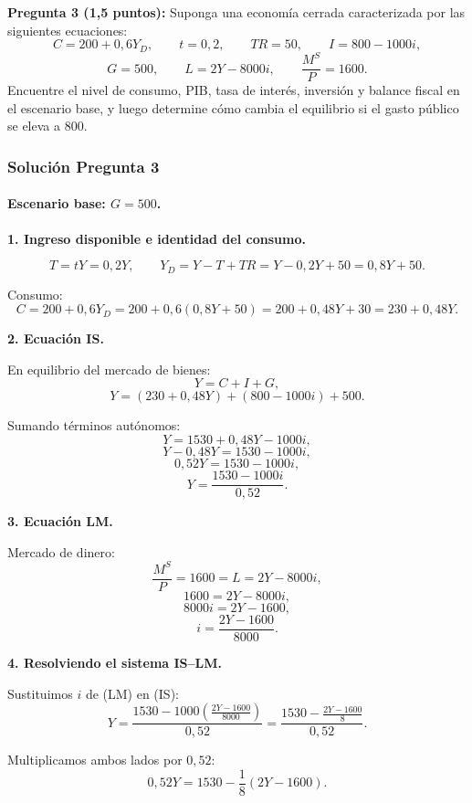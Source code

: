 \documentclass[11pt,addpoints]{article}
\begin{document}
\textbf{Pregunta 3 (1{,}5 puntos):}  
Suponga una economía cerrada caracterizada por las siguientes ecuaciones:
\[
C = 200 + 0{,}6Y_D, \qquad t = 0{,}2, \qquad TR = 50, \qquad I = 800 - 1000i,
\]
\[
G = 500, \qquad L = 2Y - 8000i, \qquad \frac{M^S}{P} = 1600.
\]
Encuentre el nivel de consumo, PIB, tasa de interés, inversión y balance fiscal en el escenario base, y luego determine cómo cambia el equilibrio si el gasto público se eleva a 800.

\subsubsection*{Solución Pregunta 3}

\paragraph{Escenario base: $G = 500$.}

\textbf{1. Ingreso disponible e identidad del consumo.}

\[
T = tY = 0{,}2Y, \qquad
Y_D = Y - T + TR = Y - 0{,}2Y + 50 = 0{,}8Y + 50.
\]

Consumo:
\[
C = 200 + 0{,}6Y_D
= 200 + 0{,}6(0{,}8Y + 50)
= 200 + 0{,}48Y + 30
= 230 + 0{,}48Y.
\]

\medskip

\textbf{2. Ecuación IS.}

En equilibrio del mercado de bienes:
\[
Y = C + I + G,
\]
\[
Y = (230 + 0{,}48Y) + (800 - 1000i) + 500.
\]

\newpage
\vspace*{0.5cm}
Sumando términos autónomos:
\[
Y = 1530 + 0{,}48Y - 1000i,
\]
\[
Y - 0{,}48Y = 1530 - 1000i,
\]
\[
0{,}52Y = 1530 - 1000i,
\]
\[
Y = \frac{1530 - 1000i}{0{,}52}. \tag{IS}
\]

\medskip

\textbf{3. Ecuación LM.}

Mercado de dinero:
\[
\frac{M^S}{P} = 1600 = L = 2Y - 8000i,
\]
\[
1600 = 2Y - 8000i,
\]
\[
8000i = 2Y - 1600,
\]
\[
i = \frac{2Y - 1600}{8000}. \tag{LM}
\]

\medskip

\textbf{4. Resolviendo el sistema IS--LM.}

Sustituimos $i$ de (LM) en (IS):
\[
Y = \frac{1530 - 1000\left(\frac{2Y - 1600}{8000}\right)}{0{,}52}
= \frac{1530 - \frac{2Y - 1600}{8}}{0{,}52}.
\]

Multiplicamos ambos lados por $0{,}52$:
\[
0{,}52Y = 1530 - \frac{1}{8}(2Y - 1600).
\]
\end{document}
